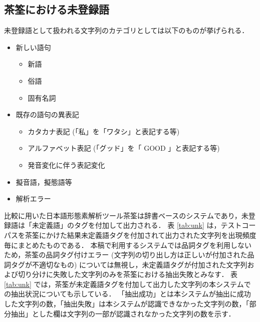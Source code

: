 \subsection{茶筌における未登録語}
\label{sec:chasenunk}
未登録語として扱われる文字列のカテゴリとしては以下のものが挙げられる．
\begin{itemize}
\item 新しい語句
     \begin{itemize}
     \item 新語
     \item 俗語
     \item 固有名詞
     \end{itemize}
\item 既存の語句の異表記
     \begin{itemize}
     \item カタカナ表記 (「私」を「ワタシ」と表記する等)
     \item アルファベット表記 (「グッド」を「 GOOD 」と表記する等)
     \item 発音変化に伴う表記変化
     \end{itemize}
\item 擬音語，擬態語等
\item 解析エラー
\end{itemize}

比較に用いた日本語形態素解析ツール茶筌は辞書ベースのシステムであり，未登録語は「未定義語」のタグを付加して出力される．
表 \ref{tab:unk} は，テストコーパスを茶筌にかけた結果未定義語タグを付加されて出力された文字列を出現頻度毎にまとめたものである．
本稿で利用するシステムでは品詞タグを利用しないため，茶筌の品詞タグ付けエラー (文字列の切り出し方は正しいが付加された品詞タグが不適切なもの) については無視し，未定義語タグが付加された文字列および切り分けに失敗した文字列のみを茶筌における抽出失敗とみなす．
表 \ref{tab:unk} では，茶筌が未定義語タグを付加して出力した文字列の本システムでの抽出状況についても示している．
「抽出成功」とは本システムが抽出に成功した文字列の数，「抽出失敗」は本システムが認識できなかった文字列の数，「部分抽出」とした欄は文字列の一部が認識されなかった文字列の数を示す．

